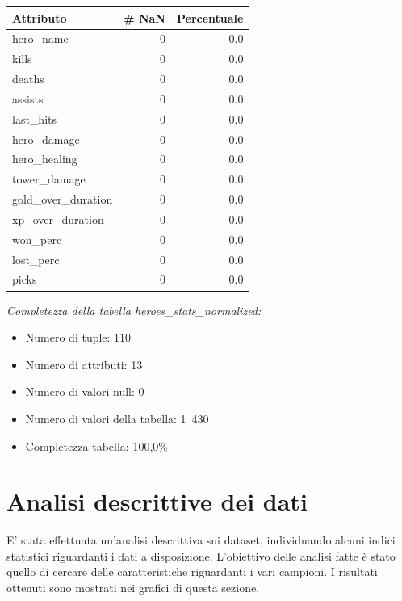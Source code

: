 \documentclass[a4paper,12pt,openany,oneside]{book}
\begin{document}
\begin{table}[!h]
	\scriptsize	
	\centering	
	\begin{tabularx}{0.37\textwidth}{lrr} 
		Attributo      &   \# NaN   &     Percentuale \\
		\midrule
		hero\_name      &       0   &    0.0 \\
		kills   &       0   &    0.0 \\
		deaths       &       0   &    0.0 \\
		assists          &       0   &    0.0 \\
		last\_hits    &       0   &    0.0 \\
		hero\_damage      &      0   &    0.0 \\
		hero\_healing       &    0   &    0.0 \\
		tower\_damage     &  0   &   0.0 \\
		gold\_over\_duration      &   0   &    0.0 \\
		xp\_over\_duration         &       0   &    0.0 \\
		won\_perc        &       0   &    0.0 \\
		lost\_perc        &       0   &    0.0 \\
		picks        &       0   &    0.0 \\
	\end{tabularx}
\end{table}
\textit{Completezza della tabella heroes\_stats\_normalized:}
\begin{itemize}
	\item Numero di tuple: 110
	\item Numero di attributi: 13
	\item Numero di valori null: 0
	\item Numero di valori della tabella: 1 430 
	\item Completezza tabella: 100,0\%
\end{itemize}

\section{Analisi descrittive dei dati}
E’ stata effettuata un’analisi descrittiva sui dataset, individuando alcuni indici statistici riguardanti i dati a disposizione. L'obiettivo delle analisi fatte è stato quello di cercare delle caratteristiche riguardanti i vari campioni. I risultati ottenuti sono mostrati nei grafici di questa sezione.
\end{document}
